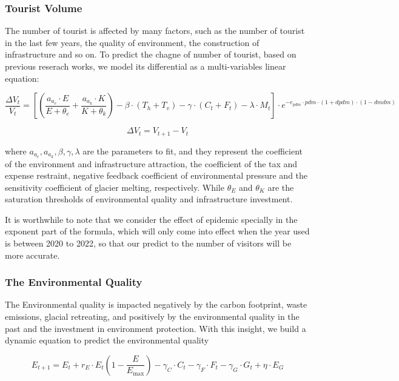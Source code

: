 \documentclass{mcmthesis}
\begin{document}
\subsubsection{Tourist Volume}
The number of tourist is affected by many factors, such as the number of tourist in the last few years, 
the quality of environment, the construction of infrastructure and so on. To predict the chagne of number of tourist,
based on previous reserach works\cite{johnston2005dynamic}, we model its differential as a multi-variables linear equation:

\begin{equation}
  \frac{\Delta V_t}{V_t} = \left[\left(\frac{a_{a_e}\cdot E}{E+\theta_e} + \frac{a_{a_k}\cdot K}{K+\theta_k} \right) - \beta\cdot(T_h+T_v) - \gamma\cdot(C_t+F_t) - \lambda\cdot M_t \right] \cdot e^{-e_{pdm} \cdot pdm \cdot (1 + dpdm) \cdot (1 - dmdm)}
\end{equation}

\begin{equation}
  \Delta V_t = V_{t+1} - V_t
\end{equation}

where $a_{a_e}, a_{a_k}, \beta, \gamma, \lambda$ are the parameters to fit, and they represent 
the coefficient of the environment and infrastructure attraction, the coefficient of the tax and expense restraint,
negative feedback coefficient of environmental pressure and the sensitivity coefficient of glacier melting, respectively.
While $\theta_E$ and $\theta_K$ are the saturation thresholds of environmental quality and infrastructure investment.

It is worthwhile to note that we consider the effect of epidemic specially in the exponent part of the formula, 
which will only come into effect when the year used is between 2020 to 2022, so that our predict to the number of 
visitors will be more accurate.

\subsubsection{The Environmental Quality}
The Environmental quality is impacted negatively by the carbon footprint, waste emissions, glacial retreating, and 
positively by the environmental quality in the past and the investment in environment protection. With this
insight, we build a dynamic equation to predict the environmental quality

\begin{equation}
  E_{t+1} = E_t + r_E \cdot E_t \left(1 - \frac{E}{E_{\text{max}}}\right) - \gamma_C \cdot C_t - \gamma_F \cdot F_t - \gamma_G \cdot G_t + \eta \cdot E_G
\end{equation}
\end{document}
